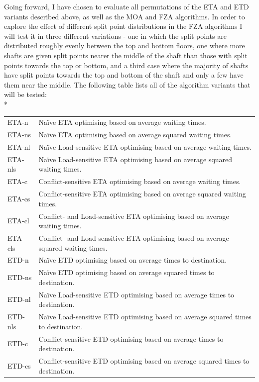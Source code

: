 \documentclass{UoYCSproject}
\begin{document}
Going forward, I have chosen to evaluate all permutations of the ETA and ETD variants described above, as well as the MOA and FZA algorithms.  In order to explore the effect of different split point distributions in the FZA algorithms I will test it in three different variations - one in which the split points are distributed roughly evenly between the top and bottom floors, one where more shafts are given split points nearer the middle of the shaft than those with split points towards the top or bottom, and a third case where the majority of shafts have split points towards the top and bottom of the shaft and only a few have them near the middle.  The following table lists all of the algorithm variants that will be tested:\\*
\begin{tabularx}{\linewidth}{l X}
	ETA-n		& Na\"{i}ve ETA optimising based on average waiting times. \\
	ETA-ns		& Na\"{i}ve ETA optimising based on average squared waiting times. \\
	ETA-nl		& Na\"{i}ve Load-sensitive ETA optimising based on average waiting times. \\
	ETA-nls		& Na\"{i}ve Load-sensitive ETA optimising based on average squared waiting times. \\
	ETA-c		& Conflict-sensitive ETA optimising based on average waiting times. \\
	ETA-cs		& Conflict-sensitive ETA optimising based on average squared waiting times. \\
	ETA-cl		& Conflict- and Load-sensitive ETA optimising based on average waiting times. \\
	ETA-cls		& Conflict- and Load-sensitive ETA optimising based on average squared waiting times.\\
	ETD-n		& Na\"{i}ve ETD optimising based on average times to destination. \\
	ETD-ns		& Na\"{i}ve ETD optimising based on average squared times to destination. \\
	ETD-nl		& Na\"{i}ve Load-sensitive ETD optimising based on average times to destination. \\
	ETD-nls		& Na\"{i}ve Load-sensitive ETD optimising based on average squared times to destination. \\
	ETD-c		& Conflict-sensitive ETD optimising based on average times to destination. \\
	ETD-cs		& Conflict-sensitive ETD optimising based on average squared times to destination. \\

\end{tabularx}
\end{document}
